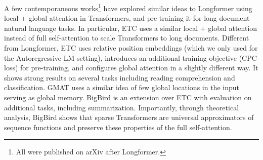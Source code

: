 A few contemporaneous works\footnote{All were published on arXiv after Longformer.} have explored similar ideas to Longformer using local + global attention in Transformers, and pre-training it for long document natural language tasks. In particular, ETC \cite{ainslie-etal-2020-etc} uses a similar local + global attention instead of full self-attention to scale Transformers to long documents. Different from Longformer, ETC uses relative position embeddings (which we only used for the Autoregressive LM setting), introduces an additional training objective (CPC loss) for pre-training, and configures global attention in a slightly different way. It shows strong results on several tasks including reading comprehension and classification.
GMAT \cite{Gupta2020GMATGM} uses a similar idea of few global locations in the input serving as global memory. BigBird \cite{Zaheer2020BigBT} is an extension over ETC with evaluation on additional tasks, including summarization. Importantly, through theoretical analysis, BigBird shows that sparse Transformers are universal approximators of sequence functions and preserve these properties of the full self-attention.

